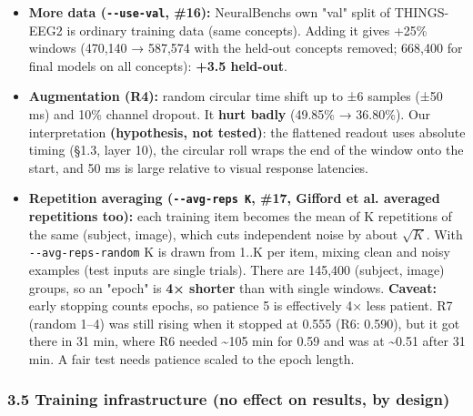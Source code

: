 \documentclass[
  11pt,
]{article}
\providecommand{\tightlist}{%
  \setlength{\itemsep}{0pt}\setlength{\parskip}{0pt}}
\renewcommand{\_}{\oldunderscore\allowbreak}
\begin{document}
\begin{itemize}
\tightlist
\item
  \textbf{More data
  (\texttt{-\/-use-val}, \#16):}
  NeuralBench\textquotesingle s own
  "val" split of THINGS-EEG2 is ordinary
  training data (same concepts). Adding
  it gives +25\% windows (470,140 →
  587,574 with the held-out concepts
  removed; 668,400 for final models on
  all concepts): \textbf{+3.5 held-out}.
\item
  \textbf{Augmentation (R4):} random
  circular time shift up to ±6 samples
  (±50 ms) and 10\% channel dropout. It
  \textbf{hurt badly} (49.85\% →
  36.80\%). Our interpretation
  \textbf{(hypothesis, not tested)}: the
  flattened readout uses absolute timing
  (§1.3, layer 10), the circular roll
  wraps the end of the window onto the
  start, and 50 ms is large relative to
  visual response latencies.
\item
  \textbf{Repetition averaging
  (\texttt{-\/-avg-reps\ K}, \#17,
  Gifford et al. averaged repetitions
  too):} each training item becomes the
  mean of K repetitions of the same
  (subject, image), which cuts
  independent noise by about
  \(\sqrt{K}\). With
  \texttt{-\/-avg-reps-random} K is
  drawn from 1..K per item, mixing clean
  and noisy examples (test inputs are
  single trials). There are 145,400
  (subject, image) groups, so an "epoch"
  is \textbf{4× shorter} than with
  single windows. \textbf{Caveat:} early
  stopping counts epochs, so patience 5
  is effectively 4× less patient. R7
  (random 1--4) was still rising when it
  stopped at 0.555 (R6: 0.590), but it
  got there in 31 min, where R6 needed
  \textasciitilde105 min for 0.59 and
  was at \textasciitilde0.51 after 31
  min. A fair test needs patience scaled
  to the epoch length.
\end{itemize}

\subsubsection{3.5 Training
infrastructure (no effect on results, by
design)}\label{training-infrastructure-no-effect-on-results-by-design}
\end{document}
